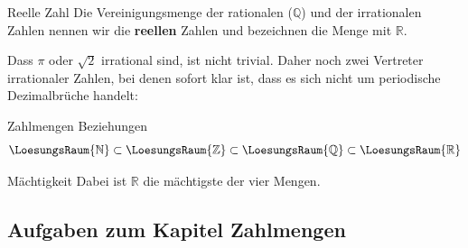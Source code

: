 
\begin{definition}{Reelle Zahl}{}
Die Vereinigungsmenge der rationalen ($\mathbb{Q}$) und der irrationalen Zahlen
nennen wir die \textbf{reellen} Zahlen und bezeichnen die Menge mit $\mathbb{R}$.
\end{definition}


Dass $\pi$ oder $\sqrt{2}$ irrational sind, ist nicht trivial. Daher
noch zwei Vertreter irrationaler Zahlen, bei denen sofort klar ist,
dass es sich nicht um periodische Dezimalbrüche handelt:


\begin{gesetz}{Zahlmengen Beziehungen}{}
$$\LoesungsRaum{\mathbb{N}} \subset \LoesungsRaum{\mathbb{Z}} \subset
  \LoesungsRaum{\mathbb{Q}} \subset \LoesungsRaum{\mathbb{R}} $$%
\end{gesetz}


\begin{bemerkung}{Mächtigkeit}{}
  Dabei ist $\mathbb{R}$ die mächtigste der vier Mengen. 
\end{bemerkung}



\subsection*{Aufgaben zum Kapitel Zahlmengen}


